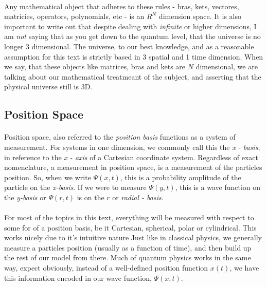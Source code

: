 \documentclass[12pt,letterpaper]{book}
\begin{document}
\paragraph*{}Any mathematical object that adheres to these rules - bras, kets, vectores, matricies, operators, polynomials, etc - is an $R^N$ dimension space. It is also important to write out that despite dealing with \textit{infinite} or higher dimensions, I am \textit{not} saying that as you get down to the quantum level, that the universe is no longer 3 dimensional. The universe, to our best knowledge, and as a reasonable assumption for this text is strictly based in 3 spatial and 1 time dimension. When we say, that these objects like matrices, bras and kets are $N$ dimensional, we are talking about our mathematical treatmeant of the subject, and asserting that the physical universe still is 3D.


\subsection*{Position Space}
\paragraph*{}Position space, also referred to the \textit{position basis} functions as a system of measurement. For systems in one dimension, we commonly call this the \textit{x - basis}, in reference to the \textit{x - axis} of a Cartesian coordinate system. Regardless of exact nomenclature, a measurement in position space, is a measurement of the particles position. So, when we write $\Psi(x,t)$, this is a probability amplitude of the particle on the \textit{x-basis}. If we were to measure $\Psi(y,t)$, this is a wave function on the \textit{y-basis} or $\Psi(r,t)$ is on the $r$ or \textit{radial - basis}.
\paragraph*{}For most of the topics in this text, everything will be measured with respect to some for of a position basis, be it Cartesian, spherical, polar or cylindrical. This works nicely due to it's intuitive nature Just like in classical physics, we generally measure a particles position (usually as a function of time), and then build up the rest of our model from there. Much of quantum physics works in the same way, expect obviously, instead of a well-defined position function $x(t)$, we have this information encoded in our wave function,
$\Psi(x,t)$.
\end{document}
